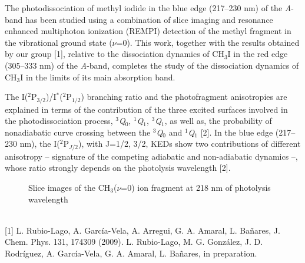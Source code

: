 The photodissociation of methyl iodide in the blue edge (217–230 nm) of the \textit{A}-band has been studied
using a combination of slice imaging and resonance enhanced
multiphoton ionization (REMPI) detection of the methyl fragment in the vibrational
ground state ($\nu$=0). This work, together with the results obtained by our group [1],
relative to the dissociation dynamics of CH$_3$I in the red edge (305–333 nm) of the \textit{A}-band,
completes the study of the dissociation dynamics of CH$_3$I in the limits of its
main absorption band.

The I($^{2}$P$_{3/2}$)/I$^{*}$($^{2}$P$_{1/2}$) branching ratio and the photofragment anisotropies are
explained in terms of the contribution of the three excited surfaces involved in the
photodissociation process, $^{3}$\textit{Q}$_{0}$, $^{1}$\textit{Q}$_{1}$, $^{3}$\textit{Q}$_{1}$, as well as, the probability of
nonadiabatic curve crossing between the  $^{3}$\textit{Q}$_{0}$ and  $^{1}$\textit{Q}$_{1}$ [2]. In the blue edge (217–230
nm), the I($^{2}$P$_{J/2}$), with J=1/2, 3/2, KEDs show two contributions of different
anisotropy – signature of the competing adiabatic and non-adiabatic dynamics –,
whose ratio strongly depends on the photolysis wavelength [2].
\\
\begin{figure}[h]
 \centerline{}
 \caption[]{Slice images of the CH$_3$($\nu$=0) ion fragment at 218 nm of photolysis wavelength}\label{figure 1}
\end{figure}
\\
{\footnotesize
[1] L. Rubio-Lago, A. García-Vela, A. Arregui, G. A. Amaral, L. Bañares, J. Chem. Phys. 131,
174309 (2009).
\newline
[2] L. Rubio-Lago, M. G. González, J. D. Rodríguez, A. García-Vela, G. A. Amaral, L. Bañares, in
preparation.
}

